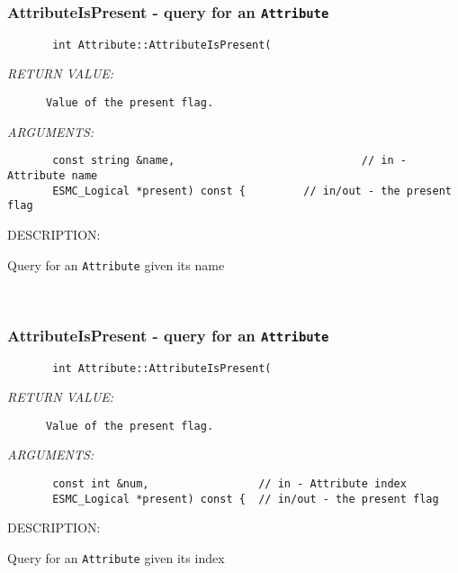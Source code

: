 \subsubsection [AttributeIsPresent] {AttributeIsPresent - query for an {\tt Attribute}}


  
\begin{verbatim}       int Attribute::AttributeIsPresent(
   \end{verbatim}{\em RETURN VALUE:}
\begin{verbatim}      Value of the present flag.
   \end{verbatim}{\em ARGUMENTS:}
\begin{verbatim}       const string &name,                             // in - Attribute name
       ESMC_Logical *present) const {         // in/out - the present flag
   \end{verbatim}
{\sf DESCRIPTION:\\ }


       Query for an {\tt Attribute} given its name
   
 
\mbox{}\hrulefill\
 
\subsubsection [AttributeIsPresent] {AttributeIsPresent - query for an {\tt Attribute}}


  
\begin{verbatim}       int Attribute::AttributeIsPresent(\end{verbatim}{\em RETURN VALUE:}
\begin{verbatim}      Value of the present flag.\end{verbatim}{\em ARGUMENTS:}
\begin{verbatim}       const int &num,                 // in - Attribute index
       ESMC_Logical *present) const {  // in/out - the present flag\end{verbatim}
{\sf DESCRIPTION:\\ }


       Query for an {\tt Attribute} given its index
   
 
\mbox{}\hrulefill\
 
